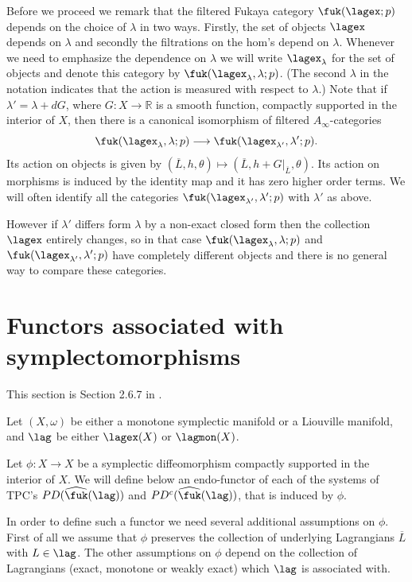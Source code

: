 Before we proceed we remark that the filtered Fukaya category
$\fuk(\lagex;p)$ depends on the choice of $\lambda$ in two
ways. Firstly, the set of objects $\lagex$ depends on $\lambda$ and
secondly the filtrations on the hom's depend  on $\lambda$.
Whenever we need to emphasize the dependence on $\lambda$ we will
write $\lagex_{\lambda}$ for the set of objects and denote this
category by $\fuk(\lagex_{\lambda}, \lambda ;p)$. (The second
$\lambda$ in the notation indicates that the action is measured with
respect to $\lambda$.) Note that if $\lambda' = \lambda + dG$, where
$G: X \longrightarrow \mathbb{R}$ is a smooth function, compactly
supported in the interior of $X$, then there is a canonical
isomorphism of filtered $A_{\infty}$-categories
\begin{equation} \label{eq:can-iso-fuk-lam} \fuk(\lagex_{\lambda},
  \lambda;p) \longrightarrow \fuk(\lagex_{\lambda'}, \lambda';p).
\end{equation}
Its action on objects is given by
$(\overline{L}, h, \theta) \longmapsto (\overline{L},
h+G|_{\overline{L}}, \theta)$. Its action on morphisms is induced by
the identity map and it has zero higher order terms. We will often
identify all the categories $ \fuk(\lagex_{\lambda'}, \lambda';p)$
with $\lambda'$ as above.

However if $\lambda'$ differs form $\lambda$ by a non-exact closed
form then the collection $\lagex$ entirely changes, so in that case
$\fuk(\lagex_{\lambda}, \lambda ;p)$ and
$\fuk(\lagex_{\lambda'}, \lambda' ;p)$ have completely different
objects and there is no general way to compare these categories.



\section{Functors associated with
  symplectomorphisms} \label{sbsb:symplecto-fun} This section is Section 2.6.7 in \cite{ABC26}.

  Let $(X, \omega)$ be
 either a monotone symplectic manifold or a Liouville manifold, and $\lag$ be either $\lagex(X)$ or $\lagmon(X)$. 

Let $\phi : X \longrightarrow X$ be a symplectic diffeomorphism
compactly supported in the interior of $X$. We will define below an endo-functor of each of the systems of TPC's $PD(\widehat{\fuk}(\lag))$ and
$PD^c(\widehat{\fuk}(\lag))$, that is induced by $\phi$.

In order to define such a functor we need several additional
assumptions on $\phi$. First of all we assume that $\phi$ preserves
the collection of underlying Lagrangians $\overline{L}$ with
$L \in \lag$. The other assumptions on $\phi$ depend on the collection
of Lagrangians (exact, monotone or weakly exact) which $\lag$ is
associated with.

